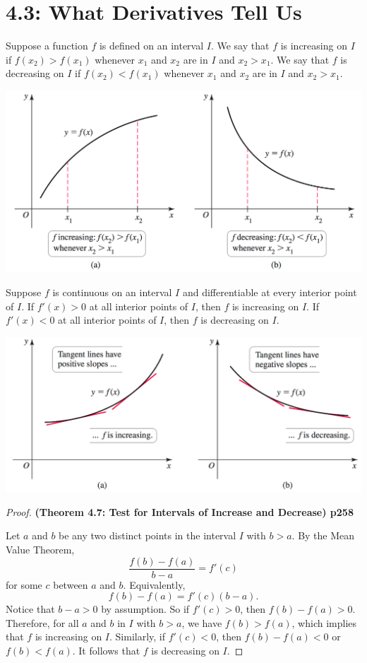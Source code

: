 \documentclass[mathNotesPreamble]{subfiles}
\begin{document}
\section{4.3: What Derivatives Tell Us}
\begin{defn*}
  Suppose a function $f$ is defined on an interval $I$. We say that $f$ is increasing on $I$ if $f(x_2)>f(x_1)$ whenever $x_1$ and $x_2$ are in $I$ and $x_2>x_1$. We say that $f$ is decreasing on $I$ if $f(x_2)<f(x_1)$ whenever $x_1$ and $x_2$ are in $I$ and $x_2>x_1$.
\end{defn*}
\begin{center}
  \includegraphics[width=0.625\linewidth]{images/briggs_04_03/fig4_20.png}
\end{center}

\begin{thmBox*}
  Suppose $f$ is continuous on an interval $I$ and differentiable at every interior point of $I$. If $f'(x)>0$ at all interior points of $I$, then $f$ is increasing on $I$. If $f'(x)<0$ at all interior points of $I$, then $f$ is decreasing on $I$.
\end{thmBox*}

\begin{center}
  \includegraphics[width=0.625\linewidth]{images/briggs_04_03/fig4_21.png}
\end{center}
\pagebreak
\begin{proof}
  \textbf{(Theorem 4.7: Test for Intervals of Increase and Decrease) p258}

  Let $a$ and $b$ be any two distinct points in the interval $I$ with $b>a$. By the Mean Value Theorem, 
    $$\frac{f(b)-f(a)}{b-a}=f'(c)$$
  for some $c$ between $a$ and $b$. Equivalently,
    $$f(b)-f(a)=f'(c)(b-a).$$
  Notice that $b-a>0$ by assumption. So if $f'(c)>0$, then $f(b)-f(a)>0$. Therefore, for all $a$ and $b$ in $I$ with $b>a$, we have $f(b)>f(a)$, which implies that $f$ is increasing on $I$. Similarly, if $f'(c)<0$, then $f(b)-f(a)<0$ or $f(b)<f(a)$. It follows that $f$ is decreasing on $I$.
\end{proof}
\end{document}
